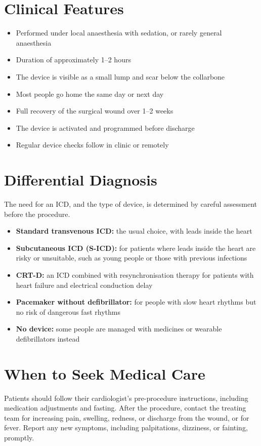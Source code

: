 \section*{Clinical Features}
\begin{itemize}
    \item Performed under local anaesthesia with sedation, or rarely general anaesthesia
    \item Duration of approximately 1--2 hours
    \item The device is visible as a small lump and scar below the collarbone
    \item Most people go home the same day or next day
    \item Full recovery of the surgical wound over 1--2 weeks
    \item The device is activated and programmed before discharge
    \item Regular device checks follow in clinic or remotely
\end{itemize}

\section*{Differential Diagnosis}
The need for an ICD, and the type of device, is determined by careful assessment before the procedure.
\begin{itemize}
    \item \textbf{Standard transvenous ICD:} the usual choice, with leads inside the heart
    \item \textbf{Subcutaneous ICD (S-ICD):} for patients where leads inside the heart are risky or unsuitable, such as young people or those with previous infections
    \item \textbf{CRT-D:} an ICD combined with resynchronisation therapy for patients with heart failure and electrical conduction delay
    \item \textbf{Pacemaker without defibrillator:} for people with slow heart rhythms but no risk of dangerous fast rhythms
    \item \textbf{No device:} some people are managed with medicines or wearable defibrillators instead
\end{itemize}

\section*{When to Seek Medical Care}
Patients should follow their cardiologist's pre-procedure instructions, including medication adjustments and fasting. After the procedure, contact the treating team for increasing pain, swelling, redness, or discharge from the wound, or for fever. Report any new symptoms, including palpitations, dizziness, or fainting, promptly.

